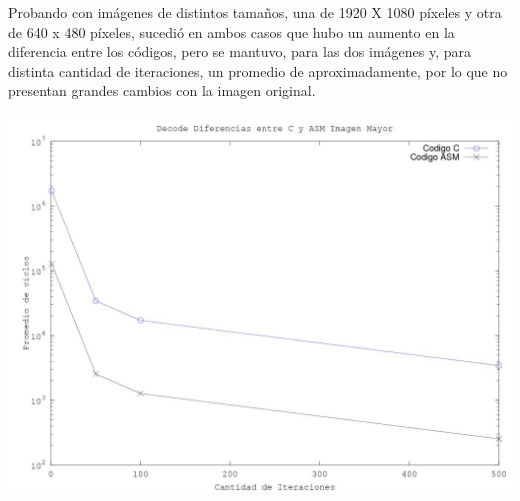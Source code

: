 Probando con im\'agenes de distintos tamaños, una de 1920 X 1080 p\'ixeles y otra de 640 x 480 p\'ixeles, sucedi\'o en ambos casos que hubo un aumento en la diferencia entre los c\'odigos, pero se mantuvo, para las dos im\'agenes y, para distinta cantidad de iteraciones, un promedio de aproximadamente, por lo que no presentan grandes cambios con la imagen original. 

\includegraphics[scale=0.7]{imagenes/DecodeMayor.jpg}

